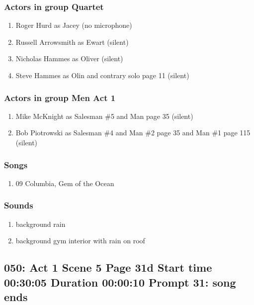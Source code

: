 \subsubsection{Actors in group Quartet}
\begin{enumerate}
\item Roger Hurd as Jacey (no microphone)
\item Russell Arrowsmith as Ewart (silent)
\item Nicholas Hammes as Oliver (silent)
\item Steve Hammes as Olin and contrary solo page 11 (silent)
\end{enumerate}
\subsubsection{Actors in group Men Act 1}
\begin{enumerate}
\item Mike McKnight as Salesman \#5 and Man page 35 (silent)
\item Bob Piotrowski as Salesman \#4 and Man \#2 page 35 and Man \#1 page 115 (silent)
\end{enumerate}

\subsubsection{Songs}
\begin{enumerate}
\item 09 Columbia, Gem of the Ocean
\end{enumerate}\subsubsection{Sounds}
\begin{enumerate}
\item background rain
\item background gym interior with rain on roof
\end{enumerate}
\subsection{050: Act 1 Scene 5 Page 31d Start time 00:30:05 Duration 00:00:10 Prompt 31: song ends}

